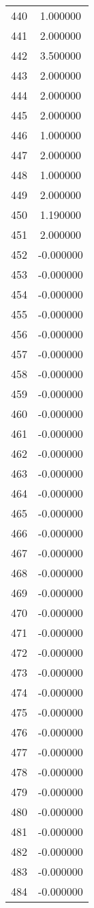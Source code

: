 \documentclass[12pt]{article}
\begin{document}
\begin{longtable}{@{}cc@{}}
440 & 1.000000 \\
441 & 2.000000 \\
442 & 3.500000 \\
443 & 2.000000 \\
444 & 2.000000 \\
445 & 2.000000 \\
446 & 1.000000 \\
447 & 2.000000 \\
448 & 1.000000 \\
449 & 2.000000 \\
450 & 1.190000 \\
451 & 2.000000 \\
452 & -0.000000 \\
453 & -0.000000 \\
454 & -0.000000 \\
455 & -0.000000 \\
456 & -0.000000 \\
457 & -0.000000 \\
458 & -0.000000 \\
459 & -0.000000 \\
460 & -0.000000 \\
461 & -0.000000 \\
462 & -0.000000 \\
463 & -0.000000 \\
464 & -0.000000 \\
465 & -0.000000 \\
466 & -0.000000 \\
467 & -0.000000 \\
468 & -0.000000 \\
469 & -0.000000 \\
470 & -0.000000 \\
471 & -0.000000 \\
472 & -0.000000 \\
473 & -0.000000 \\
474 & -0.000000 \\
475 & -0.000000 \\
476 & -0.000000 \\
477 & -0.000000 \\
478 & -0.000000 \\
479 & -0.000000 \\
480 & -0.000000 \\
481 & -0.000000 \\
482 & -0.000000 \\
483 & -0.000000 \\
484 & -0.000000 \\

\end{longtable}
\end{document}
